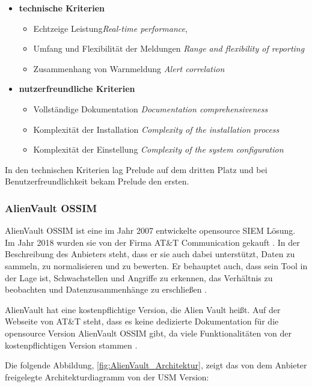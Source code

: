 \begin{itemize}[noitemsep]
   \item \textbf{technische Kriterien}
   \begin{itemize}[noitemsep]
      \item Echtzeige Leistung\textit{Real-time performance}, 
      \item Umfang und Flexibilität der Meldungen \textit{Range and flexibility of reporting}
      \item Zusammenhang von Warnmeldung \textit{Alert correlation}
   \end{itemize}

   \item \textbf{nutzerfreundliche Kriterien}
   \begin{itemize}[noitemsep]
      \item Vollständige Dokumentation \textit{Documentation comprehensiveness}
      \item Komplexität der Installation \textit{Complexity of the installation process}
      \item Komplexität der Einstellung \textit{Complexity of the system configuration}
   \end{itemize}
\end{itemize}

In den technischen Kriterien lag Prelude auf dem dritten Platz und bei Benutzerfreundlichkeit bekam Prelude den ersten. 

\subsubsection{AlienVault OSSIM}
AlienVault OSSIM ist eine im Jahr 2007 entwickelte \gls{opensource} \gls{SIEM} Lösung. Im Jahr 2018 wurden sie von der Firma AT\&T Communication gekauft  \citep{CBN_AV}. In der Beschreibung des Anbieters steht, dass er sie auch dabei unterstützt, Daten zu sammeln, zu normalisieren und zu bewerten. Er behauptet auch, dass sein Tool in der Lage ist, Schwachstellen und Angriffe zu erkennen, das Verhältnis zu beobachten und Datenzusammenhänge zu erschließen \citep{ATT_AVO}. 

AlienVault hat eine kostenpflichtige Version, die Alien Vault  heißt. Auf der Webseite von AT\&T steht, dass es keine dedizierte Dokumentation für die \gls{opensource} Version AlienVault OSSIM gibt, da viele Funktionalitäten von der kostenpflichtigen Version stammen \citep{ATT_AVO}. 

\newpage
Die folgende Abbildung, \ref{fig:AlienVault_Architektur}, zeigt das von dem Anbieter freigelegte Architekturdiagramm von der \gls{USM} Version:


